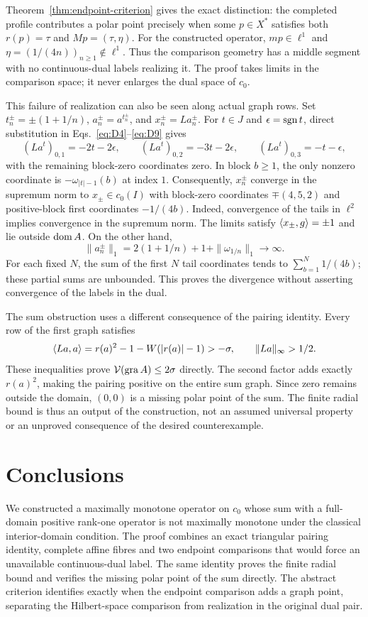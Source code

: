 Theorem~\ref{thm:endpoint-criterion} gives the exact distinction:
the completed profile contributes a polar point precisely when
some $p\in X^*$ satisfies both $r(p)=\tau$ and $Mp=(\tau,\eta)$.
For the constructed operator, $mp\in\ell^1$ and
$\eta=(1/(4n))_{n\ge1}\notin\ell^1$. Thus the comparison geometry
has a middle segment with no continuous-dual labels realizing it.
The proof takes limits in the comparison space; it never enlarges
the dual space of $c_0$.

This failure of realization can also be seen along actual graph rows.
Set $t_n^\pm=\pm(1+1/n)$, $a_n^\pm=a^{t_n^\pm}$, and
$x_n^\pm=La_n^\pm$. For $t\in J$ and $\epsilon=\operatorname{sgn} t$,
direct substitution in Eqs.~\eqref{eq:D4}--\eqref{eq:D9} gives
\[
(La^t)_{0,1}=-2t-2\epsilon,\qquad
(La^t)_{0,2}=-3t-2\epsilon,\qquad
(La^t)_{0,3}=-t-\epsilon,
\]
with the remaining block-zero coordinates zero. In block $b\ge1$,
the only nonzero coordinate is $-\omega_{|t|-1}(b)$ at index $1$.
Consequently, $x_n^\pm$ converge in the supremum norm to
$x_\pm\in c_0(I)$ with block-zero coordinates $\mp(4,5,2)$ and
positive-block first coordinates $-1/(4b)$. Indeed, convergence of
the tails in $\ell^2$ implies convergence in the supremum norm.
The limits satisfy $\langle x_\pm,g\rangle=\pm1$ and lie outside $\operatorname{dom} A$.
On the other hand,
\[
\|a_n^\pm\|_1=2(1+1/n)+1+\|\omega_{1/n}\|_1\longrightarrow\infty.
\]
For each fixed $N$, the sum of the first $N$ tail coordinates tends to
$\sum_{b=1}^N1/(4b)$; these partial sums are unbounded. This proves
the divergence without asserting convergence of the labels in the dual.

The sum obstruction uses a different consequence of the pairing identity.
Every row of the first graph satisfies
\[
\langle La,a\rangle=r(a)^2-1-W(|r(a)|-1)>-\sigma,\qquad
\|La\|_\infty>1/2.
\]
These inequalities prove $\mathcal V(\operatorname{gra} A)\le2\sigma$ directly.
The second factor adds exactly $r(a)^2$, making the pairing positive
on the entire sum graph. Since zero remains outside the domain,
$(0,0)$ is a missing polar point of the sum. The finite radial bound
is thus an output of the construction, not an assumed universal
property or an unproved consequence of the desired counterexample.



\section{Conclusions}
\label{sec:conclusion}

We constructed a maximally monotone operator on $c_0$ whose sum with a
full-domain positive rank-one operator is not maximally monotone under
the classical interior-domain condition. The proof combines an exact
triangular pairing identity, complete affine fibres and two endpoint
comparisons that would force an unavailable continuous-dual label.
The same identity proves the finite radial bound and verifies the
missing polar point of the sum directly. The abstract criterion
identifies exactly when the endpoint comparison adds a graph point,
separating the Hilbert-space comparison from realization in the
original dual pair.




